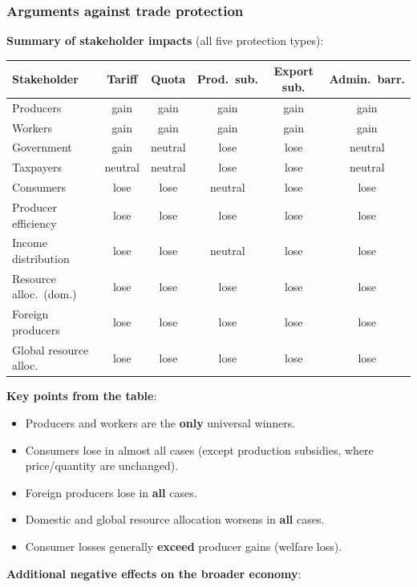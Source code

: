 \documentclass[a4paper,12pt]{article}
\begin{document}
\subsubsection*{Arguments against trade protection}
\textbf{Summary of stakeholder impacts} (all five protection types):
\begin{center}
\renewcommand{\arraystretch}{1.3}
\footnotesize
\begin{tabular}{lccccc}
\toprule
\textbf{Stakeholder} & \textbf{Tariff} & \textbf{Quota} & \textbf{Prod.\ sub.} & \textbf{Export sub.} & \textbf{Admin.\ barr.} \\
\midrule
Producers & gain & gain & gain & gain & gain \\
Workers & gain & gain & gain & gain & gain \\
Government & gain & neutral & lose & lose & neutral \\
Taxpayers & neutral & neutral & lose & lose & neutral \\
Consumers & lose & lose & neutral & lose & lose \\
Producer efficiency & lose & lose & lose & lose & lose \\
Income distribution & lose & lose & neutral & lose & lose \\
Resource alloc.\ (dom.) & lose & lose & lose & lose & lose \\
Foreign producers & lose & lose & lose & lose & lose \\
Global resource alloc. & lose & lose & lose & lose & lose \\
\bottomrule
\end{tabular}
\end{center}
\textbf{Key points from the table}:
\begin{itemize}
  \item Producers and workers are the \textbf{only} universal winners.
  \item Consumers lose in almost all cases (except production subsidies, where price/quantity are unchanged).
  \item Foreign producers lose in \textbf{all} cases.
  \item Domestic and global resource allocation worsens in \textbf{all} cases.
  \item Consumer losses generally \textbf{exceed} producer gains (welfare loss).
\end{itemize}
\textbf{Additional negative effects on the broader economy}:
\end{document}
